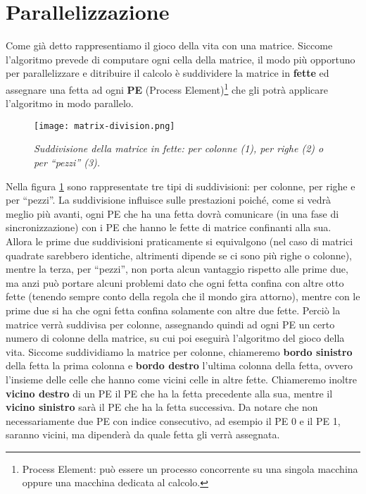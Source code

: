 \section{Parallelizzazione}
\label{sec:parallelization}
Come gi\`a detto rappresentiamo il gioco della vita con una matrice. Siccome l'algoritmo prevede di computare ogni cella della matrice, il modo pi\`u opportuno per parallelizzare e ditribuire il calcolo \`e suddividere la matrice in \textbf{fette} ed assegnare una fetta ad ogni \textbf{PE} (Process Element)\footnote{Process Element: pu\`o essere un processo concorrente su una singola macchina oppure una macchina dedicata al calcolo.} che gli potr\`a applicare l'algoritmo in modo parallelo.
\begin{figure}[ht]
  \centering
  \texttt{[image: matrix-division.png]}
  \caption{\emph{Suddivisione della matrice in fette: per colonne (1), per righe (2) o per ``pezzi'' (3).}}
  \label{fig:matrix_division}
\end{figure}
Nella figura \ref{fig:matrix_division} sono rappresentate tre tipi di suddivisioni: per colonne, per righe e per ``pezzi''. La suddivisione influisce sulle prestazioni poich\'e, come si vedr\`a meglio pi\`u avanti, ogni PE che ha una fetta dovr\`a comunicare (in una fase di sincronizzazione) con i PE che hanno le fette di matrice confinanti alla sua. Allora le prime due suddivisioni praticamente si equivalgono (nel caso di matrici quadrate sarebbero identiche, altrimenti dipende se ci sono pi\`u righe o colonne), mentre la terza, per ``pezzi'', non porta alcun vantaggio rispetto alle prime due, ma anzi pu\`o portare alcuni problemi dato che ogni fetta confina con altre otto fette (tenendo sempre conto della regola che il mondo gira attorno), mentre con le prime due si ha che ogni fetta confina solamente con altre due fette. Perci\`o la matrice verr\`a suddivisa per colonne, assegnando quindi ad ogni PE un certo numero di colonne della matrice, su cui poi eseguir\`a l'algoritmo del gioco della vita. Siccome suddividiamo la matrice per colonne, chiameremo \textbf{bordo sinistro} della fetta la prima colonna e \textbf{bordo destro} l'ultima colonna della fetta, ovvero l'insieme delle celle che hanno come vicini celle in altre fette. Chiameremo inoltre \textbf{vicino destro} di un PE il PE che ha la fetta precedente alla sua, mentre il \textbf{vicino sinistro} sar\`a il PE che ha la fetta successiva. Da notare che non necessariamente due PE con indice consecutivo, ad esempio il PE 0 e il PE 1, saranno vicini, ma dipender\`a da quale fetta gli verr\`a assegnata.

